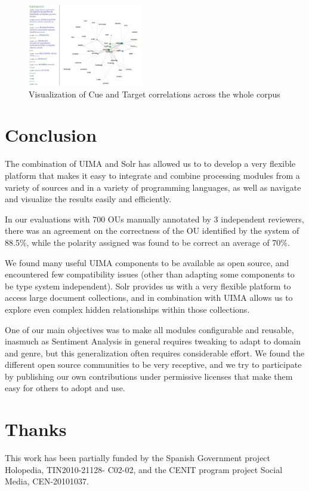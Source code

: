 \documentclass{llncs}
\begin{document}
\begin{figure}[ht!]
\centering
\includegraphics[width=5cm]{solr_visualization.png}
\caption{Visualization of Cue and Target correlations across the whole corpus} 
\label{fig:solr}
\end{figure}

\section{Conclusion}

The combination of UIMA and Solr has allowed us to to develop a very flexible platform that makes it easy to integrate and combine processing modules from a variety of sources and in a variety of programming languages, as well as navigate and visualize the results easily and efficiently.

In our evaluations with 700 OUs manually annotated by 3 independent reviewers, there was an agreement on the correctness of the OU identified by the system of 88.5\%, while the polarity assigned was found to be correct an average of 70\%.

We found many useful UIMA components to be available as open source, and encountered few compatibility issues (other than adapting some components to be type system independent). Solr provides us with a very flexible platform to access large document collections, and in combination with UIMA allows us to explore even complex hidden relationships within those collections.

One of our main objectives was to make all modules configurable and reusable, inasmuch as Sentiment Analysis in general requires tweaking to adapt to domain and genre, but this generalization often requires considerable effort. We found the different open source communities to be very receptive, and we try to participate by publishing our own contributions under permissive licenses that make them easy for others to adopt and use.

\section{Thanks}
This work has been partially funded by the Spanish
Government project Holopedia, TIN2010-21128-
C02-02, and the CENIT program project Social Media,
CEN-20101037.



\end{document}
